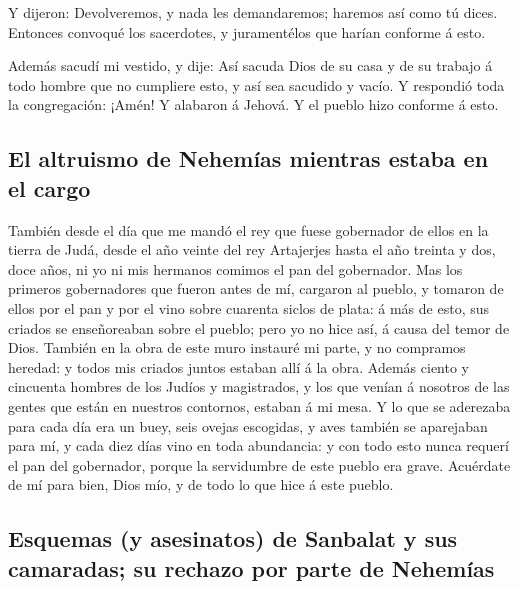  Y dijeron: Devolveremos, y nada les demandaremos; haremos
así como tú dices. Entonces convoqué los sacerdotes, y juramentélos que
harían conforme á esto.

 Además sacudí mi vestido, y dije: Así sacuda Dios de su
casa y de su trabajo á todo hombre que no cumpliere esto, y así sea
sacudido y vacío. Y respondió toda la congregación: ¡Amén! Y alabaron á
Jehová. Y el pueblo hizo conforme á esto.

\hypertarget{el-altruismo-de-nehemuxedas-mientras-estaba-en-el-cargo}{%
\subsection{El altruismo de Nehemías mientras estaba en el
cargo}\label{el-altruismo-de-nehemuxedas-mientras-estaba-en-el-cargo}}

 También desde el día que me mandó el rey que fuese
gobernador de ellos en la tierra de Judá, desde el año veinte del rey
Artajerjes hasta el año treinta y dos, doce años, ni yo ni mis hermanos
comimos el pan del gobernador.  Mas los primeros
gobernadores que fueron antes de mí, cargaron al pueblo, y tomaron de
ellos por el pan y por el vino sobre cuarenta siclos de plata: á más de
esto, sus criados se enseñoreaban sobre el pueblo; pero yo no hice así,
á causa del temor de Dios.  También en la obra de este muro
instauré mi parte, y no compramos heredad: y todos mis criados juntos
estaban allí á la obra.  Además ciento y cincuenta hombres
de los Judíos y magistrados, y los que venían á nosotros de las gentes
que están en nuestros contornos, estaban á mi mesa.  Y lo
que se aderezaba para cada día era un buey, seis ovejas escogidas, y
aves también se aparejaban para mí, y cada diez días vino en toda
abundancia: y con todo esto nunca requerí el pan del gobernador, porque
la servidumbre de este pueblo era grave.  Acuérdate de mí
para bien, Dios mío, y de todo lo que hice á este pueblo.

\hypertarget{esquemas-y-asesinatos-de-sanbalat-y-sus-camaradas-su-rechazo-por-parte-de-nehemuxedas}{%
\subsection{Esquemas (y asesinatos) de Sanbalat y sus camaradas; su
rechazo por parte de
Nehemías}\label{esquemas-y-asesinatos-de-sanbalat-y-sus-camaradas-su-rechazo-por-parte-de-nehemuxedas}}

